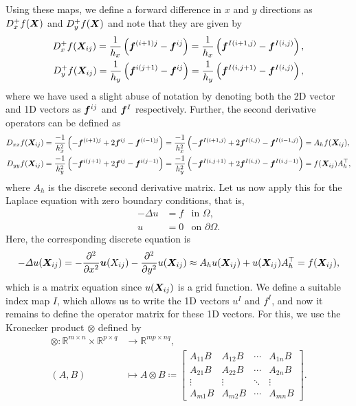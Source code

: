 \documentclass{article}
\renewcommand{\vec}{\vectorsym}
\newcommand{\R}{\mathbb{R}}
\newcommand{\tin}{\text{in }}
\newcommand{\ton}{\text{on }}
\begin{document}
Using these maps, we define a forward difference in $x$ and $y$ directions as $D^+_xf(\vec X)$ and $D^+_yf(\vec X)$ and note that they are given by
    \begin{align*}
        D^+_x f(\vec X_{ij}) = \frac 1{h_x} \left(\vec f^{(i+1)j} - \vec f^{ij}\right)= \frac 1 {h_x} \left( \vec f^{I(i+1,j)} - \vec f^{I(i,j)}\right), \\
        D^+_y f(\vec X_{ij}) = \frac 1{h_y} \left(\vec f^{i(j+1)} - \vec f^{ij}\right) = \frac 1{h_y} \left(\vec f^{I(i,j+1)} - \vec f^{I(i,j)}\right),
    \end{align*}
where we have used a slight abuse of notation by denoting both the 2D vector and 1D vectors as $\vec f^{ij}$ and $\vec f^I$ respectively. Further, the second derivative operators can be defined as 
\begin{align*}
    D_{xx} f(\vec X_{ij}) &= \frac{-1}{h_x^2} \left( -\vec f^{(i+1)j} + 2\vec f^{ij} - \vec f^{(i-1)j}\right) = \frac{-1}{h_x^2} \left( -\vec f^{I(i+1,j)} + 2\vec f^{I(i,j)} - \vec f^{I(i-1,j)}\right) = A_h f(\vec X_{ij}), \\
    D_{yy} f(\vec X_{ij}) &= \frac{-1}{h_y^2} \left( -\vec f^{i(j+1)} + 2\vec f^{ij} - \vec f^{i(j-1)}\right) = \frac{-1}{h_y^2} \left( -\vec f^{I(i,j+1)} + 2\vec f^{I(i,j)} - \vec f^{I(i,j-1)}\right) = f(\vec X_{ij})A_h^\top,
\end{align*}
where $A_h$ is the discrete second derivative matrix. Let us now apply this for the Laplace equation with zero boundary conditions, that is,
$$\begin{aligned}
    -\Delta u &= f & \tin \Omega, \\
    u &= 0 & \ton \partial\Omega.
\end{aligned}$$
Here, the corresponding discrete equation is
\begin{equation*}
    -\Delta u(\vec X_{ij}) = - \frac{\partial^2}{\partial x^2}\vec u(X_{ij}) - \frac{\partial^2}{\partial y^2} u(\vec X_{ij}) \approx A_h u(\vec X_{ij}) + u(\vec X_{ij})A_h^\top  = f(\vec X_{ij}),
\end{equation*}
which is a matrix equation since $u(\vec X_{ij})$ is a grid function. We define a suitable index map $I$, which allows us to write the 1D vectors $u^I$ and $f^I$, and now it remains to define the operator matrix for these 1D vectors. For this, we use the Kronecker product $\otimes$ defined by
$$
\begin{aligned}
    \otimes : \R^{m\times n} \times \R^{p\times q} &\to \R^{mp\times nq}, \\
    (A,B) &\mapsto A\otimes B \coloneqq \begin{bmatrix}
        A_{11}B & A_{12}B & \cdots & A_{1n}B \\
        A_{21}B & A_{22}B & \cdots & A_{2n}B \\
        \vdots & \vdots & \ddots & \vdots \\
        A_{m1}B & A_{m2}B & \cdots & A_{mn}B
    \end{bmatrix}. \\
\end{aligned}
$$
\end{document}
